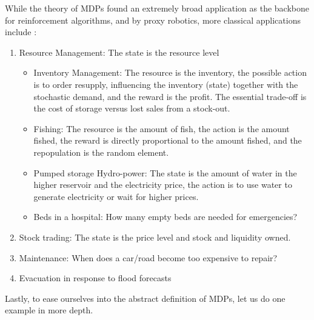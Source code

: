 While the theory of MDPs found an extremely broad application as the backbone for reinforcement algorithms, and by proxy robotics, more classical applications include \parencite{whiteRealApplicationsMarkov1985}:
\begin{enumerate}
	\item Resource Management: The state is the resource level
	\begin{itemize}
		\item Inventory Management: The resource is the inventory, the possible action is to order resupply, influencing the inventory (state) together with the stochastic demand, and the reward is the profit. The essential trade-off is the cost of storage versus lost sales from a stock-out.
		\item Fishing: The resource is the amount of fish, the action is the amount fished, the reward is directly proportional to the amount fished, and the repopulation is the random element.
		\item Pumped storage Hydro-power: The state is the amount of water in the higher reservoir and the electricity price, the action is to use water to generate electricity or wait for higher prices.
		\item Beds in a hospital: How many empty beds are needed for emergencies?
	\end{itemize}
	\item Stock trading: The state is the price level and stock and liquidity owned.
	\item Maintenance: When does a car/road become too expensive to repair?
	\item Evacuation in response to flood forecasts
\end{enumerate}
Lastly, to ease ourselves into the abstract definition of MDPs, let us do one example in more depth.

